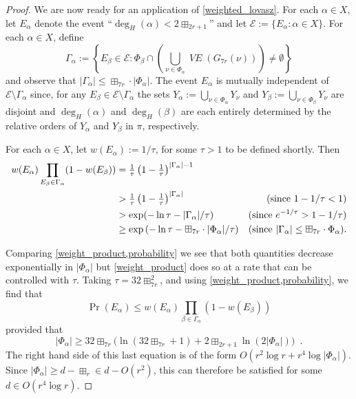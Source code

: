 \documentclass{patmorin}
\newcommand{\vol}[1]{\boxplus_{#1}}
\DeclareMathOperator{\VE}{\mathit{VE}}
\begin{document}
\begin{proof}
  We are now ready for an application of \cref{weighted_lovasz}.  For each $\alpha\in X$, let $E_\alpha$ denote the event ``$\deg_H(\alpha)< 2\vol{2r+1}$'' and let $\mathcal{E}:=\{E_\alpha:\alpha\in X\}$. For each $\alpha\in X$, define
  \[
     \Gamma_\alpha := \left\{E_\beta \in \mathcal{E}: \Phi_\beta\cap \left(\bigcup_{\nu\in \Phi_\alpha} \VE(G_{7r}(\nu))\right)\neq\emptyset\right\}
  \]
  and observe that $|\Gamma_\alpha|\le \vol{7r}\cdot|\Phi_\alpha|$.
  The event $E_\alpha$ is mutually independent of $\mathcal{E}\setminus\Gamma_\alpha$ since, for any $E_\beta\in\mathcal{E}\setminus\Gamma_\alpha$ the sets $Y_\alpha:=\bigcup_{\nu\in\Phi_\alpha} Y_\nu$ and $Y_\beta:=\bigcup_{\nu\in \Phi_\beta} Y_\nu$ are disjoint and $\deg_H(\alpha)$ and $\deg_H(\beta)$ are each entirely determined by the relative orders of $Y_\alpha$ and $Y_\beta$ in $\pi$, respectively.

  For each $\alpha\in X$, let $w(E_\alpha):=1/\tau$, for some $\tau>1$ to be defined shortly.  Then
  \begin{align}
    w(E_\alpha)\prod_{E_\beta\in\Gamma_\alpha} (1-w(E_\beta))
    & = \tfrac{1}{\tau}\left(1-\tfrac{1}{\tau}\right)^{|\Gamma_\alpha|-1} \notag \\
    & > \tfrac{1}{\tau}\left(1-\tfrac{1}{\tau}\right)^{|\Gamma_\alpha|}
      & \text{(since $1-1/\tau<1$)}\notag \\
    & > \exp(-\ln\tau-|\Gamma_\alpha|/\tau)
      & \text{(since $e^{-1/\tau}> 1-1/\tau$)}\notag \\
    & \ge \exp\left(-\ln\tau - \vol{7r}\cdot|\Phi_\alpha|/\tau\right)
      & \text{(since $|\Gamma_\alpha|\le \vol{7r}\cdot\Phi_\alpha$).}  \label{weight_product}
  \end{align}

  Comparing \cref{weight_product,probability} we see that both quantities decrease exponentially in $|\Phi_\alpha|$ but \cref{weight_product} does so at a rate that can be controlled with $\tau$.
  Taking $\tau = {32\vol{7r}^2}$, and using \cref{weight_product,probability}, we find that
  \[
     \Pr\left(E_\alpha\right) \le w(E_\alpha)\prod_{\beta\in\Gamma_\alpha}(1-w(E_\beta))
  \]
  provided that
  \[   |\Phi_\alpha| \ge {32\vol{7r}}\big(\ln({32\vol{7r}}+1) + {2\vol{2r+1}}\ln(2|\Phi_\alpha|)\big) \enspace .
  \]
  The right hand side of this last equation is of the form $O(r^2\log r+r^4\log|\Phi_\alpha|)$.  Since $|\Phi_\alpha|\ge d-\vol{r}\in d- O(r^2)$, this can therefore be satisfied for some $d\in O(r^4\log r)$.


\end{proof}
\end{document}
